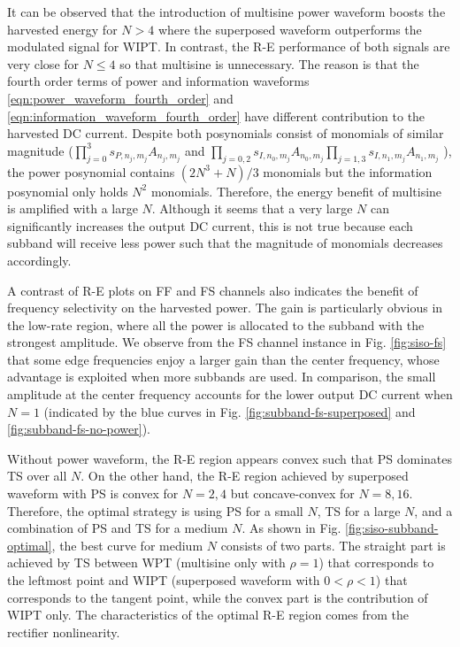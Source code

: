 It can be observed that the introduction of multisine power waveform boosts the harvested energy for $N > 4$ where the superposed waveform outperforms the modulated signal for WIPT. In contrast, the R-E performance of both signals are very close for $N \leqslant 4$ so that multisine is unnecessary. The reason is that the fourth order terms of power and information waveforms \eqref{eqn:power_waveform_fourth_order} and \eqref{eqn:information_waveform_fourth_order} have different contribution to the harvested DC current. Despite both posynomials consist of monomials of similar magnitude (${\prod\nolimits_{j = 0}^3 {{s_{P,{n_j},{m_j}}}{A_{{n_j},{m_j}}}} }$ and $\prod\nolimits_{j = 0,2} {{s_{I,{n_0},{m_j}}}{A_{{n_0},{m_j}}}} \prod\nolimits_{j = 1,3} {{s_{I,{n_1},{m_j}}}{A_{{n_1},{m_j}}}} $ ), the power posynomial contains $(2{N^3} + N)/3$ monomials but the information posynomial only holds ${N^2}$ monomials. Therefore, the energy benefit of multisine is amplified with a large $N$. Although it seems that a very large $N$ can significantly increases the output DC current, this is not true because each subband will receive less power such that the magnitude of monomials decreases accordingly.

A contrast of R-E plots on FF and FS channels also indicates the benefit of frequency selectivity on the harvested power. The gain is particularly obvious in the low-rate region, where all the power is allocated to the subband with the strongest amplitude. We observe from the FS channel instance in Fig. \ref{fig:siso-fs} that some edge frequencies enjoy a larger gain than the center frequency, whose advantage is exploited when more subbands are used. In comparison, the small amplitude at the center frequency accounts for the lower output DC current when $N = 1$ (indicated by the blue curves in Fig. \ref{fig:subband-fs-superposed} and \ref{fig:subband-fs-no-power}).

Without power waveform, the R-E region appears convex such that PS dominates TS over all $N$. On the other hand, the R-E region achieved by superposed waveform with PS is convex for $N = 2,4$ but concave-convex for $N = 8,16$. Therefore, the optimal strategy is using PS for a small $N$, TS for a large $N$, and a combination of PS and TS for a medium $N$. As shown in Fig. \ref{fig:siso-subband-optimal}, the best curve for medium $N$ consists of two parts. The straight part is achieved by TS between WPT (multisine only with $\rho  = 1$) that corresponds to the leftmost point and WIPT (superposed waveform with $0 < \rho  < 1$) that corresponds to the tangent point, while the convex part is the contribution of WIPT only. The characteristics of the optimal R-E region comes from the rectifier nonlinearity.

